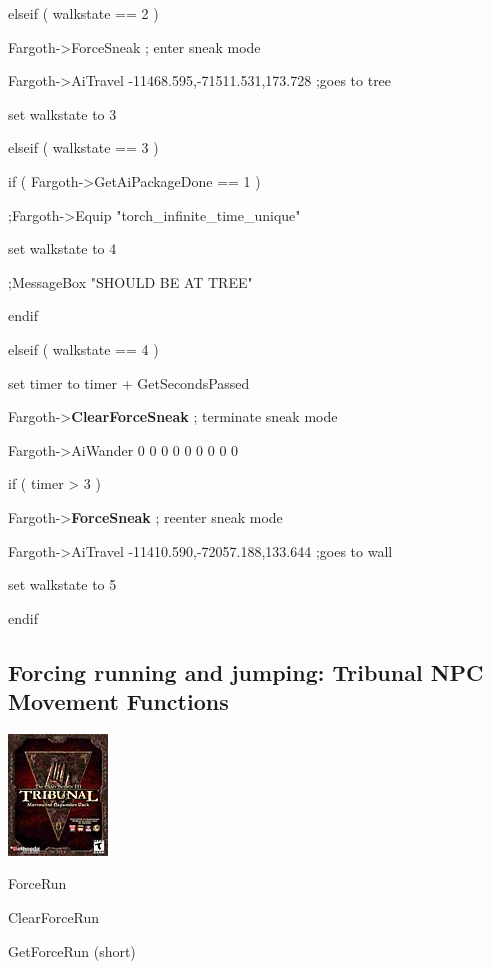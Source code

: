 \documentclass[
]{article}
\begin{document}
elseif ( walkstate == 2 )

Fargoth-\textgreater ForceSneak ; enter sneak mode

Fargoth-\textgreater AiTravel -11468.595,-71511.531,173.728 ;goes to
tree

set walkstate to 3

elseif ( walkstate == 3 )

if ( Fargoth-\textgreater GetAiPackageDone == 1 )

;Fargoth-\textgreater Equip "torch\_infinite\_time\_unique"

set walkstate to 4

;MessageBox "SHOULD BE AT TREE"

endif

elseif ( walkstate == 4 )

set timer to timer + GetSecondsPassed

Fargoth-\textgreater{}\textbf{ClearForceSneak} ; terminate sneak mode

Fargoth-\textgreater AiWander 0 0 0 0 0 0 0 0 0

if ( timer \textgreater{} 3 )

Fargoth-\textgreater{}\textbf{ForceSneak} ; reenter sneak mode

Fargoth-\textgreater AiTravel -11410.590,-72057.188,133.644 ;goes to
wall

set walkstate to 5

endif

\hypertarget{forcing-running-and-jumping-tribunal-npc-movement-functions}{%
\subsection{\texorpdfstring{\hfill\break
Forcing running and jumping: Tribunal NPC Movement
Functions}{ Forcing running and jumping: Tribunal NPC Movement Functions}}\label{forcing-running-and-jumping-tribunal-npc-movement-functions}}

\includegraphics{media/image6.png}

ForceRun

ClearForceRun

GetForceRun (short)
\end{document}
